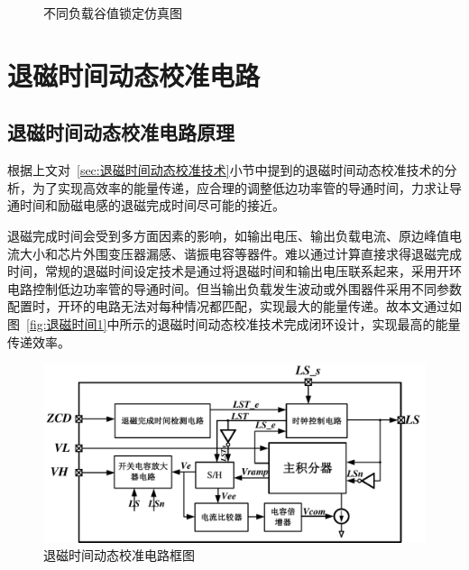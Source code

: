 \begin{figure}[htbp]
	\centering
	\caption{不同负载谷值锁定仿真图}
	\label{fig:谷值锁定放大仿真图}
\end{figure}

\section{退磁时间动态校准电路}

\subsection{退磁时间动态校准电路原理}

根据上文对~\ref{sec:退磁时间动态校准技术}小节中提到的退磁时间动态校准技术的分析，为了实现高效率的能量传递，应合理的调整低边功率管的导通时间，力求让导通时间和励磁电感的退磁完成时间尽可能的接近。

退磁完成时间会受到多方面因素的影响，如输出电压、输出负载电流、原边峰值电流大小和芯片外围变压器漏感、谐振电容等器件。难以通过计算直接求得退磁完成时间，常规的退磁时间设定技术是通过将退磁时间和输出电压联系起来，采用开环电路控制低边功率管的导通时间。但当输出负载发生波动或外围器件采用不同参数配置时，开环的电路无法对每种情况都匹配，实现最大的能量传递。故本文通过如图~\ref{fig:退磁时间1}中所示的退磁时间动态校准技术完成闭环设计，实现最高的能量传递效率。

\begin{figure}[htbp] 
    \centering
    \includegraphics[width=0.8\linewidth]{figures/退磁技术框图.pdf}
    \caption{退磁时间动态校准电路框图}
    \label{fig:退磁时间动态校准电路框图}
\end{figure} 

